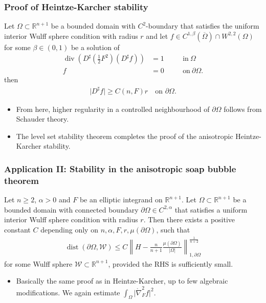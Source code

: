 \documentclass{beamer}
\newcommand{\sub}{\subset}
\newcommand{\mr}{\mathring}
\newcommand{\bbR}{\mathbb{R}}
\newcommand{\8}{\infty}
\newcommand{\al}{\alpha}
\newcommand{\Om}{\Omega}
\newcommand{\cW}{\mathcal{W}}
\newcommand{\del}{\partial}
\newcommand{\n}{\nabla}
\newcommand{\tfr}[2]{\tfrac{#1}{#2}}
\DeclareMathOperator{\dive}{div}
\DeclareMathOperator{\dist}{dist}
\newcommand{\eq}[1]{\begin{equation}\begin{alignedat}{2} #1 \end{alignedat}\end{equation}}
\newcommand{\abs}[1]{\lvert #1\rvert}
\newcommand{\q}{\quad}
\begin{document}
\begin{frame} 
\frametitle{Proof of Heintze-Karcher stability}


\begin{lemma}[Gradient bound on $\del\Om$]\label{Lem-IWC-bound}
Let $\Om\subset\mathbb{R}^{n+1}$ be a bounded domain with  $C^{2}$-boundary that satisfies the uniform interior Wulff sphere condition with radius $r$ and let $f\in C^{1,\beta}(\overline\Om)\cap W^{2,2}(\Om)$ for some $\beta\in(0,1)$ be a solution of
 \eq{\dive(D^{\sharp}(\tfr 12 F^{2})(D^{\sharp }f)) &=1\q &&\mbox{in}~\Om\\
	f&=0\q &&\mbox{on}~\del\Om.}
then
\eq{
\vert D^\sharp f\vert
    \geq C(n,F)r\quad\text{on }\del\Om.
}
\end{lemma}

\begin{itemize}
\item From here, higher regularity in a controlled neighbourhood of $\del\Om$ follows from Schauder theory.
\item The level set stability theorem completes the proof of the anisotropic Heintze-Karcher stability.
\end{itemize}

\end{frame}


\begin{frame} 
\frametitle{Application II: Stability in the anisotropic soap bubble theorem}

\begin{theorem}
Let $n\geq 2$, $\al>0$ and $F$ be an elliptic integrand on $\mathbb{R}^{n+1}$.
Let $\Om\sub \bbR^{n+1}$ be a bounded domain with connected boundary $\del\Om\in C^{2,\al}$ that satisfies a uniform interior Wulff sphere condition with radius $r$. 
Then there exists a positive constant $C$ depending only on $n,\al,F,r,\mu(\del\Om)$, such that 
\eq{
\dist(\del\Om,{\cW})
    \leq C
    \left\|H-\tfr{n}{n+1}\tfr{\mu(\del\Om)}{\abs{\Om}}\right\|_{1,\del\Om}^{\frac{1}{n+2}}
}
for some Wulff sphere ${\cW}\subset\mathbb{R}^{n+1}$, provided the RHS is sufficiently small.
\end{theorem}
\begin{itemize}
\item Basically the same proof as in Heintze-Karcher, up to few algebraic modifications. We again estimate $\int_{\Om}\abs{\mr\n^{2}_{F}f}^{2}$.
\end{itemize}

\end{frame}
\end{document}
